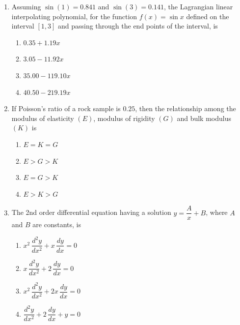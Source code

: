 \documentclass[journal]{IEEEtran}
\begin{document}
\begin{enumerate}[leftmargin=0pt]
\item Assuming $\sin(1)=0.841$ and $\sin(3)=0.141$, the Lagrangian linear interpolating polynomial,
for the function $f(x)=\sin x$ defined on the interval $[1,3]$ and passing through the end points of
the interval, is
\begin{multicols}{2}
\begin{enumerate}[label=(\Alph*), itemsep=0pt, topsep=2pt]
  \item $0.35 + 1.19x$
  \item $3.05 - 11.92x$
  \item $35.00 - 119.10x$
  \item $40.50 - 219.19x$
\end{enumerate}
\end{multicols}
\hfill{}

\item If Poisson’s ratio of a rock sample is $0.25$, then the relationship among the modulus of
elasticity $(E)$, modulus of rigidity $(G)$ and bulk modulus $(K)$ is
\begin{multicols}{2}
\begin{enumerate}[label=(\Alph*), itemsep=0pt, topsep=2pt]
  \item $E = K = G$
  \item $E > G > K$
  \item $E = G > K$
  \item $E > K > G$
\end{enumerate}
\end{multicols}
\hfill{}

\item The 2nd order differential equation having a solution $y=\dfrac{A}{x}+B$, where $A$ and $B$
are constants, is
\begin{multicols}{2}
\begin{enumerate}[label=(\Alph*), itemsep=0pt, topsep=2pt]
  \item $x^2\,\dfrac{d^2y}{dx^2} + x\,\dfrac{dy}{dx}=0$\\[0.5em]
  \item $x\,\dfrac{d^2y}{dx^2} + 2\,\dfrac{dy}{dx}=0$
  \item $x^2\,\dfrac{d^2y}{dx^2} + 2x\,\dfrac{dy}{dx}=0$\\[0.5em]
  \item $\dfrac{d^2y}{dx^2} + 2\,\dfrac{dy}{dx} + y = 0$
\end{enumerate}
\end{multicols}
\hfill{}


\end{enumerate}
\end{document}
